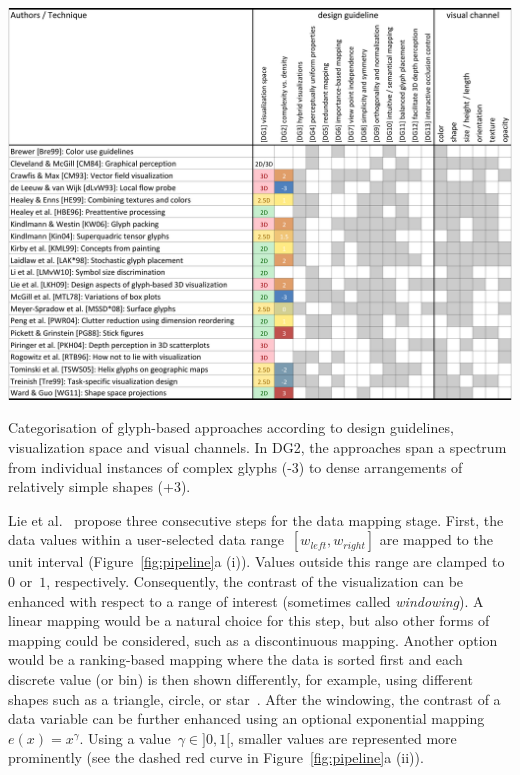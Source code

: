 \begin{table}%
\centering
  \includegraphics[width=\textwidth]{images/related-work-glyphs/table1.png}
\caption{Categorisation of glyph-based approaches according to design guidelines, visualization space and visual channels. In DG2, the approaches span a spectrum from individual instances of complex glyphs (-3) to dense arrangements of relatively simple shapes (+3).}
\label{tab:scheme}
\end{table}
Lie et al.~\cite{lie09glyphs} propose three consecutive steps for the 
data mapping stage.
First, the data values within a user-selected data range~$[w_\mathit{left}, w_\mathit{right}]$ are mapped to the unit interval (Figure~\ref{fig:pipeline}a (i)).
Values outside this range are clamped to~$0$ or~$1$, respectively.
Consequently, the contrast of the visualization can be enhanced with respect to a range of interest (sometimes called \emph{windowing}).
A linear mapping would be a natural choice for this step, but also other forms of mapping could be considered, such as a discontinuous mapping.
Another option would be a ranking-based mapping where the data is sorted first and each discrete value (or bin) is then shown differently, for example, using different shapes such as a triangle, circle, or star~\cite{stolte02polaris}.
After the windowing, the contrast of a data variable can be further enhanced using an optional exponential mapping~$e(x)=x^\gamma$.
Using a value~$\gamma \in ]0, 1[$, smaller values are represented more prominently (see the dashed red curve in Figure~\ref{fig:pipeline}a (ii)).
